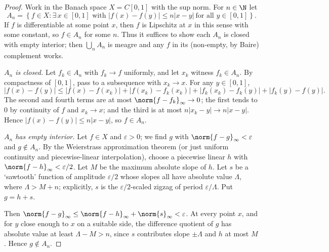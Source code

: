 \begin{proof}
	Work in the Banach space $X = C[0,1]$ with the sup norm. For $n \in \N$ let
	$$A_n = \left\{ f \in X : \exists\, x \in [0,1] \text{ with } |f(x) - f(y)| \leq n|x-y| \ \text{for all } y \in [0,1] \right\}.$$
	If $f$ is differentiable at some point $x$, then $f$ is Lipschitz at $x$ in this sense with some constant, so $f \in A_n$ for some $n$. Thus it suffices to show each $A_n$ is closed with empty interior; then $\bigcup_n A_n$ is meagre and any $f$ in its (non-empty, by Baire) complement works.

	\emph{$A_n$ is closed.} Let $f_k \in A_n$ with $f_k \to f$ uniformly, and let $x_k$ witness $f_k \in A_n$. By compactness of $[0,1]$, pass to a subsequence with $x_k \to x$. For any $y \in [0,1]$,
	$$|f(x) - f(y)| \leq |f(x) - f(x_k)| + |f(x_k) - f_k(x_k)| + |f_k(x_k) - f_k(y)| + |f_k(y) - f(y)|.$$
	The second and fourth terms are at most $\norm{f - f_k}_\infty \to 0$; the first tends to $0$ by continuity of $f$ and $x_k \to x$; and the third is at most $n|x_k - y| \to n|x - y|$. Hence $|f(x)-f(y)| \leq n|x-y|$, so $f \in A_n$.

	\emph{$A_n$ has empty interior.} Let $f \in X$ and $\varepsilon > 0$; we find $g$ with $\norm{f - g}_\infty < \varepsilon$ and $g \notin A_n$. By the Weierstrass approximation theorem (or just uniform continuity and piecewise-linear interpolation), choose a piecewise linear $h$ with $\norm{f - h}_\infty < \varepsilon/2$. Let $M$ be the maximum absolute slope of $h$. Let $s$ be a `sawtooth' function of amplitude $\varepsilon/2$ whose slopes all have absolute value $\Lambda$, where $\Lambda > M + n$; explicitly, $s$ is the $\varepsilon/2$-scaled zigzag of period $\varepsilon/\Lambda$. Put $g = h + s$.

	Then $\norm{f - g}_\infty \leq \norm{f-h}_\infty + \norm{s}_\infty < \varepsilon$. At every point $x$, and for $y$ close enough to $x$ on a suitable side, the difference quotient of $g$ has absolute value at least $\Lambda - M > n$, since $s$ contributes slope $\pm \Lambda$ and $h$ at most $M$. Hence $g \notin A_n$.
\end{proof}

